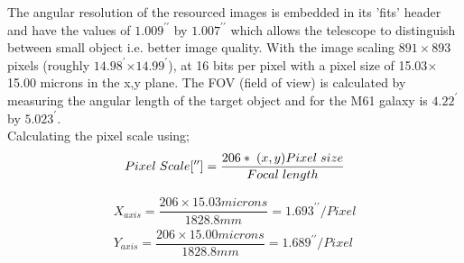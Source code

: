\documentclass[12pt]{article}
\begin{document}
The angular resolution of the resourced images is embedded in its 'fits' header and have the values of $1.009^{\prime \prime}$ by $1.007^{\prime \prime}$ which allows the telescope to distinguish between small object i.e. better image quality. With the image scaling $891\times893$ pixels (roughly $14.98^{\prime}$$\times$$14.99^{\prime}$), at 16 bits per pixel with a pixel size of 15.03$\times$ 15.00 microns in the x,y plane. The FOV (field of view) is calculated by measuring the angular length of the target object and for the M61 galaxy is $4.22^{\prime}$ by $5.023^{\prime}$.\\

Calculating the pixel scale using; \\

\begin{equation}
Pixel \hspace{0.1cm} Scale[^{\prime \prime}] = \dfrac{206 * \hspace{0.1cm} (x,y) Pixel \hspace{0.1cm} size}{Focal \hspace{0.1cm} length} 
\end{equation}

\begin{equation}
    \begin{array}{l}
    X_{axis} = \dfrac{206 \times 15.03 microns}{1828.8mm} = 1.693^{\prime \prime} / Pixel \\ [0.5cm]
    Y_{axis} = \dfrac{206 \times 15.00 microns}{1828.8mm} = 1.689^{\prime \prime} / Pixel
    \end{array}
\end{equation}
\end{document}
